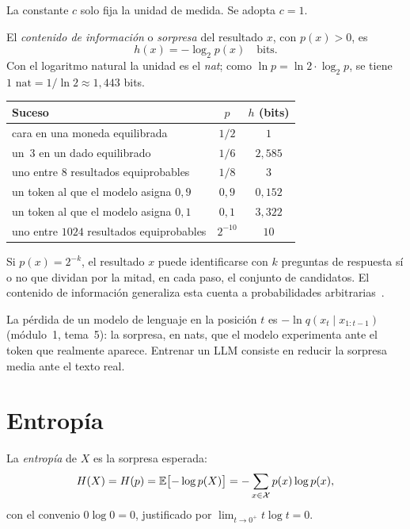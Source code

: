 La constante $c$ solo fija la unidad de medida. Se adopta $c=1$.

\begin{definicion}\label{def:sorpresa}
El \emph{contenido de información} o \emph{sorpresa} del resultado $x$, con $p(x)>0$, es
\[
h(x)=-\log_2 p(x)\quad\text{bits}.
\]
Con el logaritmo natural la unidad es el \emph{nat}; como $\ln p=\ln 2\cdot\log_2 p$, se tiene $1\text{ nat}=1/\ln 2\approx 1{,}443$ bits.
\end{definicion}

\begin{center}
\begin{tabular}{@{}lcc@{}}
\toprule
Suceso & $p$ & $h$ (bits) \\
\midrule
cara en una moneda equilibrada & $1/2$ & $1$ \\
un~3 en un dado equilibrado & $1/6$ & $2{,}585$ \\
uno entre 8 resultados equiprobables & $1/8$ & $3$ \\
un token al que el modelo asigna $0{,}9$ & $0{,}9$ & $0{,}152$ \\
un token al que el modelo asigna $0{,}1$ & $0{,}1$ & $3{,}322$ \\
uno entre $1024$ resultados equiprobables & $2^{-10}$ & $10$ \\
\bottomrule
\end{tabular}
\end{center}

Si $p(x)=2^{-k}$, el resultado $x$ puede identificarse con $k$ preguntas de respuesta sí o no que dividan por la mitad, en cada paso, el conjunto de candidatos. El contenido de información generaliza esta cuenta a probabilidades arbitrarias~\cite[cap.~4]{mackay}.

\begin{observacion}
La pérdida de un modelo de lenguaje en la posición $t$ es $-\ln q(x_t\mid x_{1:t-1})$ (módulo~1, tema~5): la sorpresa, en nats, que el modelo experimenta ante el token que realmente aparece. Entrenar un LLM consiste en reducir la sorpresa media ante el texto real.
\end{observacion}

\section{Entropía}

\begin{definicion}[Entropía]\label{def:entropia}
La \emph{entropía} de $X$ es la sorpresa esperada:
\[
H(X)=H(p)=\mathbb{E}\bigl[-\log p(X)\bigr]=-\sum_{x\in\mathcal{X}}p(x)\log p(x),
\]
con el convenio $0\log 0=0$, justificado por $\lim_{t\to 0^{+}}t\log t=0$.
\end{definicion}

